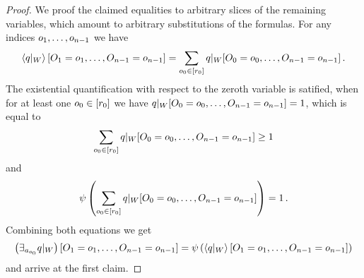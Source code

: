 \begin{proof}

	
	We proof the claimed equalities to arbitrary slices of the remaining variables, which amount to arbitrary substitutions of the formulas.
	For any indices $o_{1},\ldots,o_{n-1}$ we have
	\begin{align*}
		\left\langle {q}|_{W}\right\rangle \left[ O_{1}=o_{1},\ldots,O_{n-1}=o_{n-1} \right]
		= \sum_{o_{0}\in[r_{0}]} {q}|_{W}[O_{0}=o_{0},\ldots,O_{n-1}=o_{n-1}] \, . 
	\end{align*}
	The existential quantification with respect to the zeroth variable is satified, when for at least one $o_{0}\in[r_{0}]$ we have ${q}|_{W}[O_{0}=o_{0},\ldots,O_{n-1}=o_{n-1}]=1$, which is equal to 
	\begin{align*}
		 \sum_{o_{0}\in[r_{0}]} {q}|_{W}[O_{0}=o_{0},\ldots,O_{n-1}=o_{n-1}]  \geq 1
	\end{align*}
	and
	\begin{align*}
		\psi\left(\sum_{o_{0}\in[r_{0}]} {q}|_{W}[O_{0}=o_{0},\ldots,O_{n-1}=o_{n-1}] \right) = 1 \, . 
	\end{align*}
	Combining both equations we get
	\begin{align*}
		\left({\exists_{a_{o_{0}}}  q}|_{W}\right)[O_{1}=o_{1},\ldots,O_{n-1}=o_{n-1}] 
		= \psi\left(
			\left\langle {q}|_{W}\right\rangle \left[ O_{1}=o_{1},\ldots,O_{n-1}=o_{n-1} \right]
			\right)
	\end{align*}
	and arrive at the first claim.
	

\end{proof}

